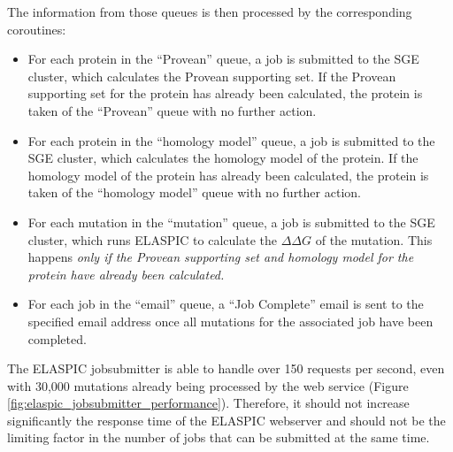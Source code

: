 The information from those queues is then processed by the corresponding coroutines:

\vspace{-\topsep}
\begin{itemize}
	\itemsep0em
	\item For each protein in the ``Provean'' queue, a job is submitted to the SGE cluster, which calculates the Provean supporting set. If the Provean supporting set for the protein has already been calculated, the protein is taken of the ``Provean'' queue with no further action.
	\item For each protein in the ``homology model'' queue, a job is submitted to the SGE cluster, which calculates the homology model of the protein. If the homology model of the protein has already been calculated, the protein is taken of the ``homology model'' queue with no further action.
	\item For each mutation in the ``mutation'' queue, a job is submitted to the SGE cluster, which runs ELASPIC to calculate the $\Delta \Delta G$ of the mutation. This happens \textit{only if the Provean supporting set and homology model for the protein have already been calculated.}
	\item For each job in the ``email'' queue, a ``Job Complete'' email is sent to the specified email address once all mutations for the associated job have been completed.
\end{itemize}

The ELASPIC jobsubmitter is able to handle over 150 requests per second, even with 30,000 mutations already being processed by the web service (Figure \ref{fig:elaspic_jobsubmitter_performance}). Therefore, it should not increase significantly the response time of the ELASPIC webserver and should not be the limiting factor in the number of jobs that can be submitted at the same time.

